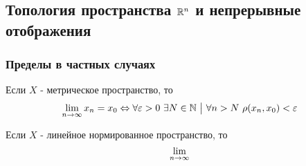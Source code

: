 \subsection{Топология пространства $\mathbb{R}^n$ и непрерывные отображения}

\subsubsection*{Пределы в частных случаях}

\begin{proposition}
	Если $X$ - метрическое пространство, то
	\[
		\lim\limits_{n \to \infty} x_n = x_0 \Leftrightarrow \forall \varepsilon > 0\ \exists N \in \mathbb{N} \ \big|\  \forall n > N\ \rho(x_n, x_0) < \varepsilon
	\]
\end{proposition}

\begin{proposition}
	Если $X$ - линейное нормированное пространство, то
	\[
		\liml_{n \to \infty}  %
	\]
\end{proposition}

